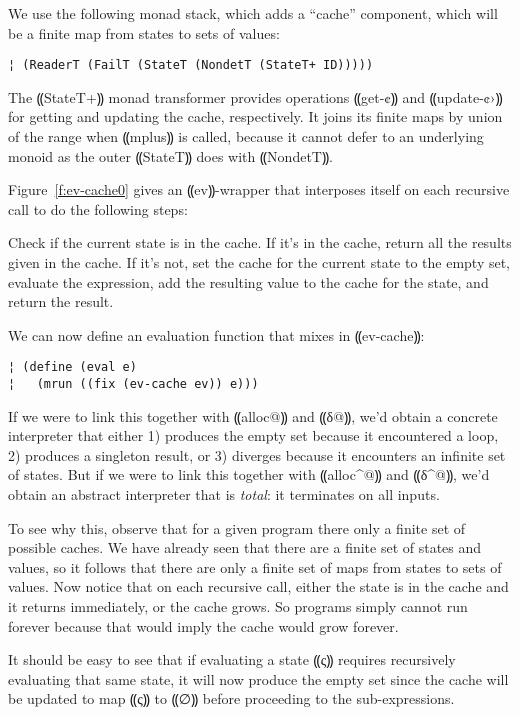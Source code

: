 We use the following monad stack, which adds a ``cache'' component,
which will be a finite map from states to sets of values:
\begin{lstlisting}
¦ (ReaderT (FailT (StateT (NondetT (StateT+ ID)))))
\end{lstlisting}

The ⸨StateT+⸩ monad transformer provides operations
⸨get-¢⸩ and ⸨update-¢›⸩ for getting and updating the
cache, respectively. It joins its finite maps by union of the range
when ⸨mplus⸩ is called, because it cannot defer to an
underlying monoid as the outer ⸨StateT⸩ does with
⸨NondetT⸩.

Figure~\ref{f:ev-cache0} gives an ⸨ev⸩-wrapper that interposes
itself on each recursive call to do the following steps:
\begin{displayquote}
Check if the current state is in the cache.  If it's in the cache, return all
the results given in the cache.  If it's not, set the cache for the current
state to the empty set, evaluate the expression, add the resulting value to the
cache for the state, and return the result.
\end{displayquote}

We can now define an evaluation function that mixes in ⸨ev-cache⸩:
\begin{lstlisting}
¦ (define (eval e)
¦   (mrun ((fix (ev-cache ev)) e)))
\end{lstlisting}

If we were to link this together with ⸨alloc@⸩ and ⸨δ@⸩, we'd obtain a concrete
interpreter that either 1) produces the empty set because it encountered a
loop, 2) produces a singleton result, or 3) diverges because it encounters an
infinite set of states.  But if we were to link this together with ⸨alloc^@⸩
and ⸨δ^@⸩, we'd obtain an abstract interpreter that is \emph{total}: it
terminates on all inputs.

To see why this, observe that for a given program there only a finite set of
possible caches.  We have already seen that there are a finite set of states
and values, so it follows that there are only a finite set of maps from states
to sets of values.  Now notice that on each recursive call, either the state is
in the cache and it returns immediately, or the cache grows.  So programs
simply cannot run forever because that would imply the cache would grow
forever.

It should be easy to see that if evaluating a state ⸨ς⸩ requires recursively
evaluating that same state, it will now produce the empty set since the cache
will be updated to map ⸨ς⸩ to ⸨∅⸩ before proceeding to the sub-expressions.

